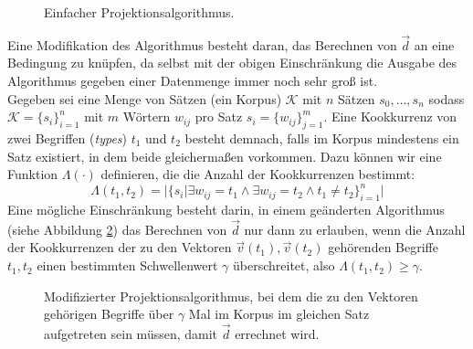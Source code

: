 \begin{figure}[h]
  \centering
  \begin{algorithm}[H]
  \end{algorithm}
  \caption[Einfacher Projektionsalgorithmus]{Einfacher Projektionsalgorithmus.\label{fig:algo1}}
\end{figure}

Eine Modifikation des Algorithmus besteht daran, das Berechnen von $\vec{d}$ an eine Bedingung zu knüpfen, da selbst
mit der obigen Einschränkung die Ausgabe des Algorithmus gegeben einer Datenmenge immer noch sehr groß ist.\\
Gegeben sei eine Menge von Sätzen (ein Korpus) $\mathcal{K}$ mit $n$ Sätzen $s_0, \ldots, s_n$ sodass $\mathcal{K} = \{s_i\}_{i=1}^{n}$ mit
$m$ Wörtern $w_{ij}$ pro Satz $s_i = \{w_{ij}\}_{j=1}^m$. Eine Kookkurrenz von zwei Begriffen (\emph{types}) $t_1$ und $t_2$
besteht demnach, falls im Korpus mindestens ein Satz existiert, in dem beide gleichermaßen vorkommen. Dazu können wir
eine Funktion $\Lambda(\cdot)$ definieren, die die Anzahl der Kookkurrenzen bestimmt:
\begin{equation}\label{form:lambda-cooc}
  \Lambda(t_1, t_2) = |\{s_i | \exists w_{ij} = t_1 \land \exists w_{ij} = t_2 \land t_1\neq t_2\}_{i=1}^{n}|
\end{equation}
Eine mögliche Einschränkung besteht darin, in einem geänderten Algorithmus (siehe Abbildung \ref{fig:algo2}) das Berechnen von $\vec{d}$ nur
dann zu erlauben, wenn die Anzahl der Kookkurrenzen der zu den Vektoren $\vec{v}(t_1), \vec{v}(t_2)$ gehörenden Begriffe $t_1, t_2$
einen bestimmten Schwellenwert $\gamma$ überschreitet, also $\Lambda(t_1, t_2) \geq \gamma$.

\begin{figure}[h]
  \centering
  \begin{algorithm}[H]
  \end{algorithm}
  \caption[Modifizierter Projektionsalgorithmus]{Modifizierter Projektionsalgorithmus, bei dem die zu den Vektoren gehörigen
  Begriffe über $\gamma$ Mal im Korpus im gleichen Satz aufgetreten sein müssen, damit $\vec{d}$ errechnet wird.\label{fig:algo2}}
\end{figure}


